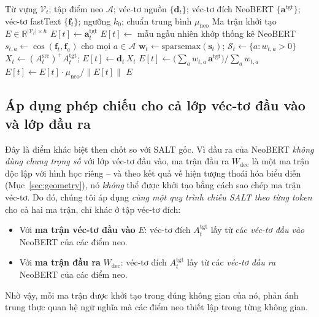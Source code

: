 \begin{algorithm}[ht]
  \caption{Phương pháp SALT theo từng token cho một ma trận đích}
  \label{alg:salt}
  \begin{algorithmic}[1]
    \Require Từ vựng $\mathcal{V}_t$; tập điểm neo $\mathcal{A}$; véc-tơ nguồn $\{\mathbf{d}_t\}$;
      véc-tơ đích NeoBERT $\{\mathbf{a}^{\mathrm{tgt}}\}$; véc-tơ fastText $\{\mathbf{f}_t\}$;
      ngưỡng $k_0$; chuẩn trung bình $\mu_{\mathrm{neo}}$
    \Ensure Ma trận khởi tạo $E \in \mathbb{R}^{|\mathcal{V}_t| \times h}$
        \State $E[t] \gets \mathbf{a}^{\mathrm{tgt}}_{t}$
        \State $E[t] \gets$ mẫu ngẫu nhiên khớp thống kê NeoBERT
      \Else
        \State $s_{t,a} \gets \cos(\mathbf{f}_t, \mathbf{f}_a)$ cho mọi $a \in \mathcal{A}$
        \State $\mathbf{w}_t \gets \mathrm{sparsemax}(\mathbf{s}_t)$;\quad
               $\mathcal{S}_t \gets \{a : w_{t,a} > 0\}$
          \State $X_t \gets (A_t^{\mathrm{src}})^{+} A_t^{\mathrm{tgt}}$;\quad
                 $E[t] \gets \mathbf{d}_t\, X_t$
        \Else
          \State $E[t] \gets \big(\textstyle\sum_a w_{t,a}\,\mathbf{a}^{\mathrm{tgt}}\big)\big/\sum_a w_{t,a}$
        \EndIf
          \State $E[t] \gets E[t] \cdot \mu_{\mathrm{neo}} / \lVert E[t] \rVert$
        \EndIf
      \EndIf
    \EndFor
    \State \Return $E$
  \end{algorithmic}
\end{algorithm}

\subsection{Áp dụng phép chiếu cho cả lớp véc-tơ đầu vào và lớp đầu ra}
\label{subsec:both-matrices}

Đây là điểm khác biệt then chốt so với SALT gốc. Vì đầu ra của NeoBERT \textit{không dùng
chung trọng số} với lớp véc-tơ đầu vào, ma trận đầu ra $W_{\mathrm{dec}}$ là một ma trận độc lập với hình học riêng -- và theo
kết quả về hiện tượng thoái hóa biểu diễn (Mục~\ref{sec:geometry}), nó \textit{không} thể
được khởi tạo bằng cách sao chép ma trận véc-tơ. Do đó, chúng tôi áp dụng \textit{cùng một quy
trình chiếu SALT theo từng token} cho cả hai ma trận, chỉ khác ở tập véc-tơ đích:
\begin{itemize}
  \item Với \textbf{ma trận véc-tơ đầu vào} $E$: véc-tơ đích $A_t^{\mathrm{tgt}}$ lấy từ các
        \textit{véc-tơ đầu vào} NeoBERT của các điểm neo.
  \item Với \textbf{ma trận đầu ra} $W_{\mathrm{dec}}$: véc-tơ đích $A_t^{\mathrm{tgt}}$ lấy từ
        các \textit{véc-tơ đầu ra} NeoBERT của các điểm neo.
\end{itemize}
Nhờ vậy, mỗi ma trận được khởi tạo trong đúng không gian của nó, phản ánh trung thực quan hệ
ngữ nghĩa mà các điểm neo thiết lập trong từng không gian.

